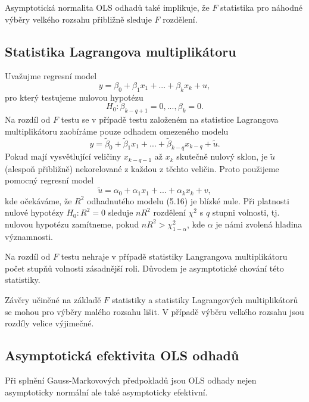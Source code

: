 Asymptotická normalita OLS odhadů také implikuje, že $F$ statistika pro náhodné výběry velkého rozsahu přibližně sleduje $F$ rozdělení.

\subsection{Statistika Lagrangova multiplikátoru}

Uvažujme regresní model
\begin{equation}
y = \beta_0 + \beta_1 x_1 + ... + \beta_k x_k + u,
\end{equation}
pro který testujeme nulovou hypotézu
\begin{equation}
H_0: \beta_{k - q + 1} = 0, ..., \beta_k = 0.
\end{equation}
Na rozdíl od $F$ testu se v případě testu založeném na statistice Lagrangova multiplikátoru zaobíráme pouze odhadem omezeného modelu
\begin{equation}
y = \tilde{\beta}_0 + \tilde{\beta}_1 x_1 + ... + \tilde{\beta}_{k - q} x_{k - q} + \tilde{u}.
\end{equation}
Pokud mají vysvětlující veličiny $x_{k  - q - 1}$ až $x_k$ skutečně nulový sklon, je $\tilde{u}$ (alespoň přibližně) nekorelované z 
každou z těchto veličin. Proto použijeme pomocný regresní model
\begin{equation}
\tilde{u} = \alpha_0 + \alpha_1 x_1 + ... + \alpha_k x_k + v,
\end{equation}
kde očekáváme, že $R^2$ odhadnutého modelu (5.16) je blízké nule. Při platnosti nulové hypotézy $H_0: R^2 = 0$ sleduje $nR^2$ rozdělení $\chi^2$ 
s $q$ stupni volnosti, tj. nulovou hypotézu zamítneme, pokud $nR^2 > \chi_{1 - \alpha}^2$, kde $\alpha$ je námi zvolená hladina významnosti.

Na rozdíl od $F$ testu nehraje v případě statistiky Langrangova multiplikátoru počet stupňů volnosti zásadnější roli. Důvodem je 
asymptotické chování této statistiky.

Závěry učiněné na základě $F$ statistiky a statistiky Lagrangových multiplikátorů se mohou pro výběry malého rozsahu lišit. V 
případě výběru velkého rozsahu jsou rozdíly velice výjimečné.

\subsection{Asymptotická efektivita OLS odhadů}

Při splnění Gauss-Markovových předpokladů jsou OLS odhady nejen asymptoticky normální ale také asymptoticky efektivní.

